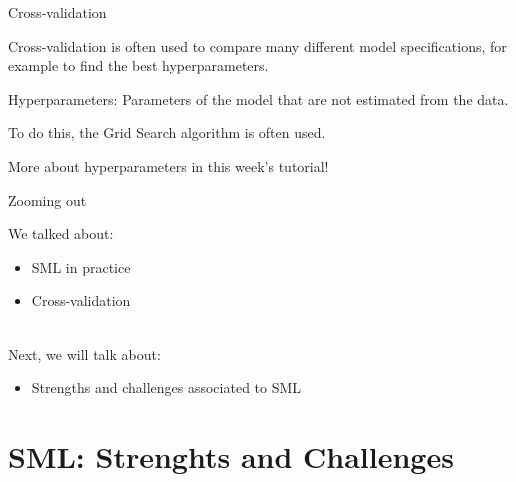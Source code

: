 \documentclass[handout]{beamer}
\begin{document}
\begin{frame}{Cross-validation}
	
	Cross-validation is often used to compare many different model specifications, for example to find the best hyperparameters.
	
	Hyperparameters: Parameters of the model that are not estimated from the data. 
	
	To do this, the Grid Search algorithm is often used.
	
	More about hyperparameters in this week's tutorial!
	
\end{frame}




\begin{frame}{Zooming out} 
	
	We talked about:
	\begin{itemize}
		\item SML in practice
		\item Cross-validation \\\
	\end{itemize}
	
	Next, we will talk about:
	\begin{itemize}
		\item Strengths and challenges associated to SML
	\end{itemize}
	
\end{frame}


\section{SML: Strenghts and Challenges}
\end{document}
